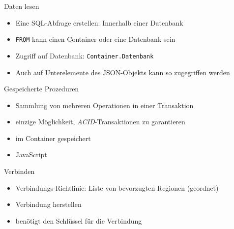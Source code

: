 \begin{flashcard}[Definition]{Daten lesen}
    \begin{itemize}
        \item Eine SQL-Abfrage erstellen: Innerhalb einer Datenbank
        \item \texttt{FROM} kann einen Container oder eine Datenbank sein
        \item Zugriff auf Datenbank: \texttt{Container.Datenbank}
        \item Auch auf Unterelemente des JSON-Objekts kann so zugegriffen werden
    \end{itemize}
\end{flashcard}

\begin{flashcard}[Definition]{Gespeicherte Prozeduren}
    \begin{itemize}
        \item Sammlung von mehreren Operationen in einer Transaktion
        \item einzige Möglichkeit, \emph{ACID}-Transaktionen zu garantieren
        \item im Container gespeichert
        \item JavaScript
    \end{itemize}
\end{flashcard}

\begin{flashcard}[Definition]{Verbinden}
    \begin{itemize}
        \item Verbindungs-Richtlinie: Liste von bevorzugten Regionen (geordnet)
        \item Verbindung herstellen
        \item benötigt den Schlüssel für die Verbindung
    \end{itemize}
\end{flashcard}


